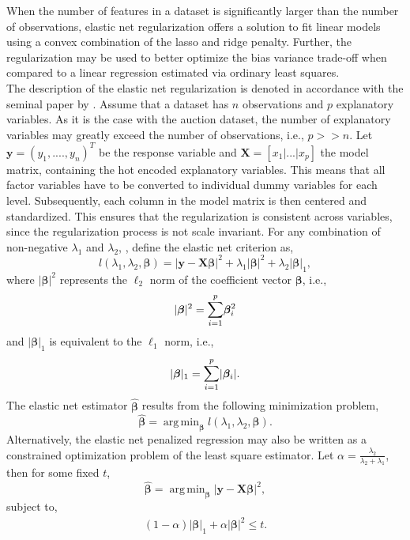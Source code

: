 \documentclass[a4paper,12pt, headsepline]{scrartcl}
\DeclareMathOperator*{\argminA}{arg\,min}
\numberwithin{equation}{section}
\begin{document}
When the number of features in a dataset is significantly larger than the number of observations, elastic net regularization offers a solution to fit linear models using a convex combination of the lasso and ridge penalty. Further, the regularization may be used to better optimize the bias variance trade-off when compared to a linear regression estimated via ordinary least squares.\\
The description of the elastic net regularization is denoted in accordance with the seminal paper by \citet{hastie03}. Assume that a dataset has $n$ observations and $p$ explanatory variables. As it is the case with the auction dataset, the number of explanatory variables may greatly exceed the number of observations, i.e., $p >> n$. Let $\mathbf{y} = (y_1, ...., y_n)^T$ be the response variable and $\mathbf{X} = [x_1|...|x_p]$ the model matrix, containing the hot encoded explanatory variables. This means that all factor variables have to be converted to individual dummy variables for each level. Subsequently, each column in the model matrix is then centered and standardized. This ensures that the regularization is consistent across variables, since the regularization process is not scale invariant. For any combination of non-negative $\lambda_1$ and $\lambda_2$, \citet{hastie03}, define the elastic net criterion as,
\[
l(\lambda_1, \lambda_2, \bm{\beta}) = |\mathbf{y} - \mathbf{X}\bm{\beta}|^2 +\lambda_1|\bm{\beta}|^2 +\lambda_2|\bm{\beta}|_1, 
\]
where $|\bm{\beta}|^2$ represents the $\ell_2$ norm of the coefficient vector $\bm{\beta}$, i.e., 
\[
|\bm{\beta}|^2 = \mathlarger{\sum}\limits_{i = 1}^{p}\bm{\beta}_i^2
\]
and $|\bm{\beta}|_1$ is equivalent to the $\ell_1$ norm, i.e.,  
\[
|\bm{\beta}|_1 = \mathlarger{\sum}\limits_{i = 1}^{p}|\bm{\beta}_i|.
\]
The elastic net estimator $\bm{\hat{\beta}}$ results from the following minimization problem,
\[
\bm{\hat{\beta}} = \argminA_{\bm{\beta}} l(\lambda_1, \lambda_2, \bm{\beta}).
\]
Alternatively, the elastic net penalized regression may also be written as a constrained optimization problem of the least square estimator. Let $\alpha = \frac{\lambda_2}{\lambda_2 + \lambda_1}$, then for some fixed $t$, 
\[
\bm{\hat{\beta}} = \argminA_{\bm{\beta}} |\mathbf{y} - \mathbf{X}\bm{\beta}|^2,
\]
subject to,
\begin{gather}
(1 - \alpha)|\bm{\beta}|_1 + \alpha|\bm{\beta}|^2 \leq t.
\end{gather}
\end{document}
